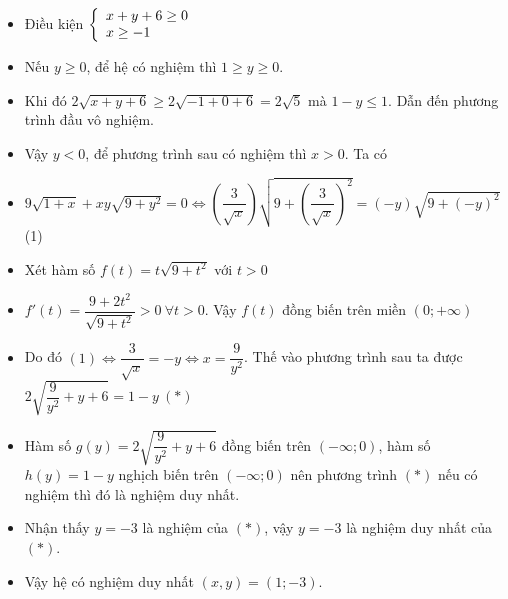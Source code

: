 \lgi 
\begin{itemize}[label=,leftmargin=*]
\item Điều kiện $\left\{\begin{array}{ll}x+y+6 \ge 0 \\ x\ge -1\end{array}\right.$
\item Nếu $y\ge 0$, để hệ có nghiệm thì $1\ge y\ge 0$.
\item Khi đó $2\sqrt{x+y+6}\ge 2\sqrt{-1+0+6}=2\sqrt{5}$ mà $1-y\le 1$. Dẫn đến phương trình đầu vô nghiệm.
\item Vậy $y<0$, để phương trình sau có nghiệm thì $x>0$. Ta có 
\item $9\sqrt{1+x}+xy\sqrt{9+y^2}=0 \Leftrightarrow \left(\dfrac{3}{\sqrt{x}} \right)\sqrt{9+\left(\dfrac{3}{\sqrt{x}} \right)^2}=(-y)\sqrt{9+(-y)^2}$ (1)
\item Xét hàm số $f(t)=t\sqrt{9+t^2}$ với $t>0$
\item $f'(t)=\dfrac{9+2t^2}{\sqrt{9+t^2}}>0 \ \forall t>0$. Vậy $f(t)$ đồng biến trên miền $(0;+\infty)$
\item Do đó $(1)\Leftrightarrow \dfrac{3}{\sqrt{x}}=-y\Leftrightarrow x=\dfrac{9}{y^2}$. Thế vào phương trình sau ta được $2\sqrt{\dfrac{9}{y^2}+y+6}=1-y \ (*)$
\item Hàm số $g(y)=2\sqrt{\dfrac{9}{y^2}+y+6}$ đồng biến trên $(-\infty;0)$, hàm số $h(y)=1-y$ nghịch biến trên $(-\infty;0)$ nên phương trình $(*)$ nếu có nghiệm thì đó là nghiệm duy nhất. 
\item Nhận thấy $y=-3$ là nghiệm của $(*)$, vậy $y=-3$ là nghiệm duy nhất của $(*)$.
\item Vậy hệ có nghiệm duy nhất $(x,y)=(1;-3)$.
\end{itemize}

